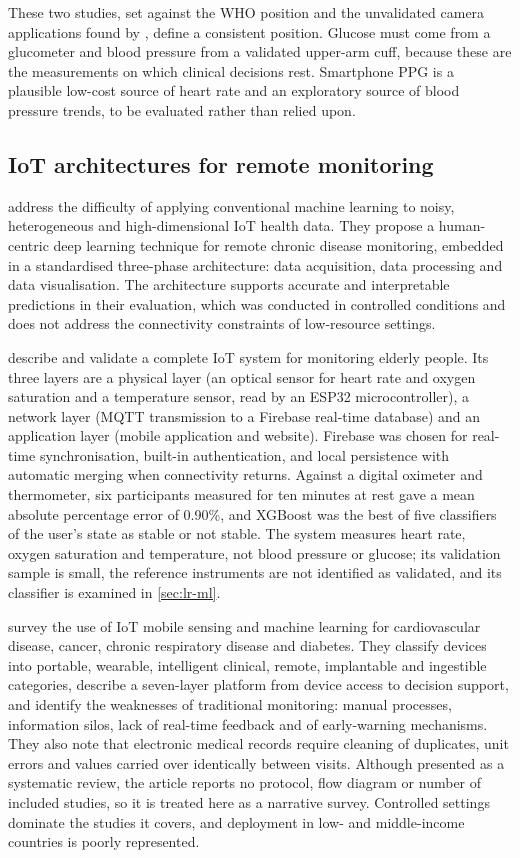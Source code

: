These two studies, set against the WHO position and the unvalidated camera applications found by \textcite{alessa2019}, define a consistent position. Glucose must come from a glucometer and blood pressure from a validated upper-arm cuff, because these are the measurements on which clinical decisions rest. Smartphone PPG is a plausible low-cost source of heart rate and an exploratory source of blood pressure trends, to be evaluated rather than relied upon.

\subsection{IoT architectures for remote monitoring}

\Textcite{tai2024} address the difficulty of applying conventional machine learning to noisy, heterogeneous and high-dimensional IoT health data. They propose a human-centric deep learning technique for remote chronic disease monitoring, embedded in a standardised three-phase architecture: data acquisition, data processing and data visualisation. The architecture supports accurate and interpretable predictions in their evaluation, which was conducted in controlled conditions and does not address the connectivity constraints of low-resource settings.

\Textcite{efendi2025} describe and validate a complete IoT system for monitoring elderly people. Its three layers are a physical layer (an optical sensor for heart rate and oxygen saturation and a temperature sensor, read by an ESP32 microcontroller), a network layer (MQTT transmission to a Firebase real-time database) and an application layer (mobile application and website). Firebase was chosen for real-time synchronisation, built-in authentication, and local persistence with automatic merging when connectivity returns. Against a digital oximeter and thermometer, six participants measured for ten minutes at rest gave a mean absolute percentage error of 0.90\%, and XGBoost was the best of five classifiers of the user's state as stable or not stable. The system measures heart rate, oxygen saturation and temperature, not blood pressure or glucose; its validation sample is small, the reference instruments are not identified as validated, and its classifier is examined in \cref{sec:lr-ml}.

\Textcite{liu2025review} survey the use of IoT mobile sensing and machine learning for cardiovascular disease, cancer, chronic respiratory disease and diabetes. They classify devices into portable, wearable, intelligent clinical, remote, implantable and ingestible categories, describe a seven-layer platform from device access to decision support, and identify the weaknesses of traditional monitoring: manual processes, information silos, lack of real-time feedback and of early-warning mechanisms. They also note that electronic medical records require cleaning of duplicates, unit errors and values carried over identically between visits. Although presented as a systematic review, the article reports no protocol, flow diagram or number of included studies, so it is treated here as a narrative survey. Controlled settings dominate the studies it covers, and deployment in low- and middle-income countries is poorly represented.

